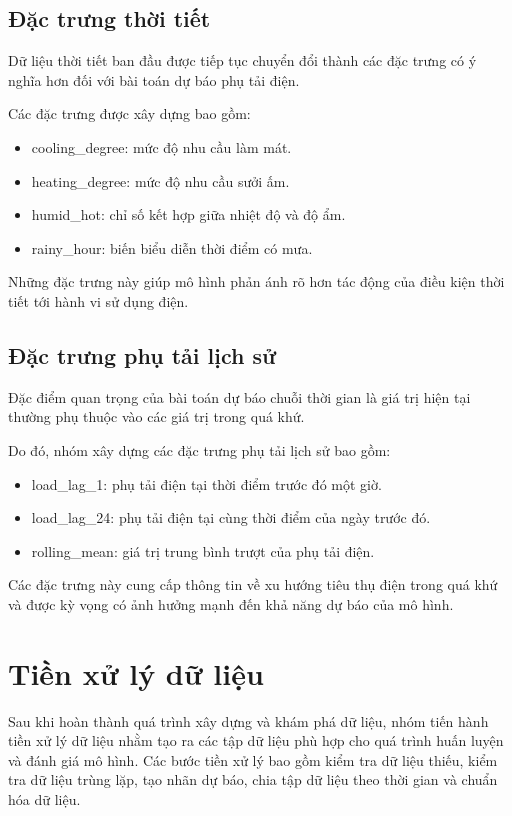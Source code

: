 \subsection{Đặc trưng thời tiết}

Dữ liệu thời tiết ban đầu được tiếp tục chuyển đổi thành các đặc trưng có ý nghĩa hơn đối với bài toán dự báo phụ tải điện.

Các đặc trưng được xây dựng bao gồm:

\begin{itemize}
\item cooling\_degree: mức độ nhu cầu làm mát.
\item heating\_degree: mức độ nhu cầu sưởi ấm.
\item humid\_hot: chỉ số kết hợp giữa nhiệt độ và độ ẩm.
\item rainy\_hour: biến biểu diễn thời điểm có mưa.
\end{itemize}

Những đặc trưng này giúp mô hình phản ánh rõ hơn tác động của điều kiện thời tiết tới hành vi sử dụng điện.

\subsection{Đặc trưng phụ tải lịch sử}

Đặc điểm quan trọng của bài toán dự báo chuỗi thời gian là giá trị hiện tại thường phụ thuộc vào các giá trị trong quá khứ.

Do đó, nhóm xây dựng các đặc trưng phụ tải lịch sử bao gồm:

\begin{itemize}
\item load\_lag\_1: phụ tải điện tại thời điểm trước đó một giờ.
\item load\_lag\_24: phụ tải điện tại cùng thời điểm của ngày trước đó.
\item rolling\_mean: giá trị trung bình trượt của phụ tải điện.
\end{itemize}

Các đặc trưng này cung cấp thông tin về xu hướng tiêu thụ điện trong quá khứ và được kỳ vọng có ảnh hưởng mạnh đến khả năng dự báo của mô hình.

\section{Tiền xử lý dữ liệu}

Sau khi hoàn thành quá trình xây dựng và khám phá dữ liệu, nhóm tiến hành tiền xử lý dữ liệu nhằm tạo ra các tập dữ liệu phù hợp cho quá trình huấn luyện và đánh giá mô hình. Các bước tiền xử lý bao gồm kiểm tra dữ liệu thiếu, kiểm tra dữ liệu trùng lặp, tạo nhãn dự báo, chia tập dữ liệu theo thời gian và chuẩn hóa dữ liệu.

